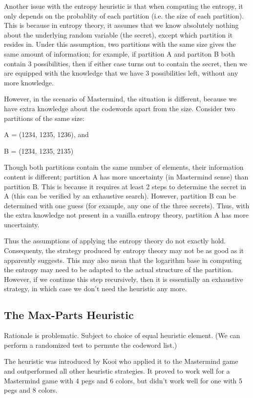 Another issue with the entropy heuristic is that when computing the entropy, it only depends on the probablity of each partition (i.e. the size of each partition). This is because in entropy theory, it assumes that we know absolutely nothing about the underlying random variable (the secret), except which partition it resides in. Under this assumption, two partitions with the same size gives the same amount of information; for example, if partition A and partiton B both contain 3 possibilities, then if either case turns out to contain the secret, then we are equipped with the knowledge that we have 3 possibilities left, without any more knowledge.

However, in the scenario of Mastermind, the situation is different, because we have extra knowledge about the codewords apart from the size. Consider two partitions of the same size:

A = (1234, 1235, 1236), and

B = (1234, 1235, 2135)

Though both partitions contain the same number of elements, their information content is different; partition A has more uncertainty (in Mastermind sense) than partition B. This is because it requires at least 2 steps to determine the secret in A (this can be verified by an exhaustive search). However, partition B can be determined with one guess (for example, any one of the three secrets). Thus, with the extra knowledge not present in a vanilla entropy theory, partition A has more uncertainty.

Thus the assumptions of applying the entropy theory do not exactly hold. Consequenty, the strategy produced by entropy theory may not be as good as it apparently suggests. This may also mean that the logarithm base in computing the entropy may need to be adapted to the actual structure of the partition. However, if we continue this step recursively, then it is essentially an exhaustive strategy, in which case we don't need the heuristic any more.



\subsection{The Max-Parts Heuristic}

Rationale is problematic. Subject to choice of equal heuristic element. (We can perform a randomized test to permute the codeword list.)

The \maxpar{} heuristic was introduced by Kooi \cite{kooi05} who applied it to the Mastermind game and outperformed all other heuristic strategies. It proved to work well for a Mastermind game with 4 pegs and 6 colors, but didn't work well for one with 5 pegs and 8 colors.

